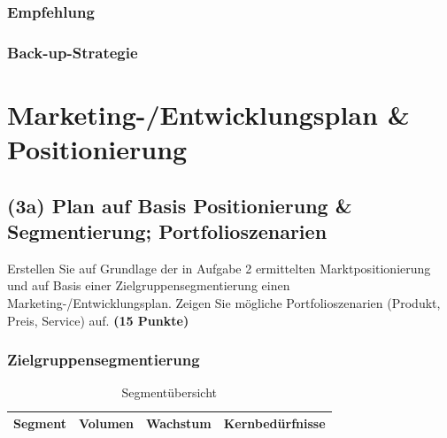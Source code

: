\documentclass[
%
ngerman %
%
numeric %
]{wbh-assignment}
\begin{document}
\subsubsection{Empfehlung}

\subsubsection{Back-up-Strategie}

\clearpage

\section{Marketing-/Entwicklungsplan \& Positionierung}
\label{sec:marketing_plan}

\subsection{(3a) Plan auf Basis Positionierung \& Segmentierung; Portfolioszenarien}
\begin{aufgabenstellung}
Erstellen Sie auf Grundlage der in Aufgabe 2 ermittelten Marktpositionierung und auf Basis einer Zielgruppensegmentierung einen Marketing-/Entwicklungsplan. Zeigen Sie mögliche Portfolioszenarien (Produkt, Preis, Service) auf. \textbf{(15 Punkte)}
\end{aufgabenstellung}

\vspace*{5mm}

\subsubsection{Zielgruppensegmentierung}
\begin{table}[htb!]
\centering
\caption{Segmentübersicht}
\begin{tabular}{l r r l}
\textbf{Segment} & \textbf{Volumen} & \textbf{Wachstum} & \textbf{Kernbedürfnisse} \\
\hline
\end{tabular}
\end{table}
\end{document}
